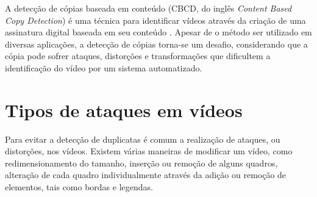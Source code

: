      
    A detecção de cópias baseada em conteúdo (CBCD, do inglês \textit{Content Based Copy Detection}) é uma técnica para identificar vídeos através da criação de uma assinatura digital baseada em seu conteúdo \cite{jiang2011pku}. Apesar de o método ser utilizado em diversas aplicações, a detecção de cópias torna-se um desafio, considerando que a cópia pode sofrer ataques, distorções e transformações que dificultem a identificação do vídeo por um sistema automatizado. 


         
         
         



\section{Tipos de ataques em vídeos}
\label{sec:ataques}

	Para evitar a detecção de duplicatas é comum a realização de ataques, ou distorções, nos vídeos. Existem várias maneiras de modificar um vídeo, como redimensionamento do tamanho, inserção ou remoção de alguns quadros, alteração de cada quadro individualmente através da adição ou remoção de elementos, tais como bordas e legendas.

